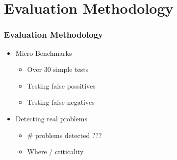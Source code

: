 \section{Evaluation Methodology}
\frametitle{Evaluation Methodology}

\begin{frame}

\begin{itemize}
	\item Micro Benchmarks
	\begin{itemize}
		\item Over 30 simple tests
		\item Testing false possitives
		\item Testing false negatives
	\end{itemize}
	\item Detecting real problems
	\begin{itemize}
		\item \# problems detected ???
		\item Where / criticality
	\end{itemize}
\end{itemize}

\end{frame}
